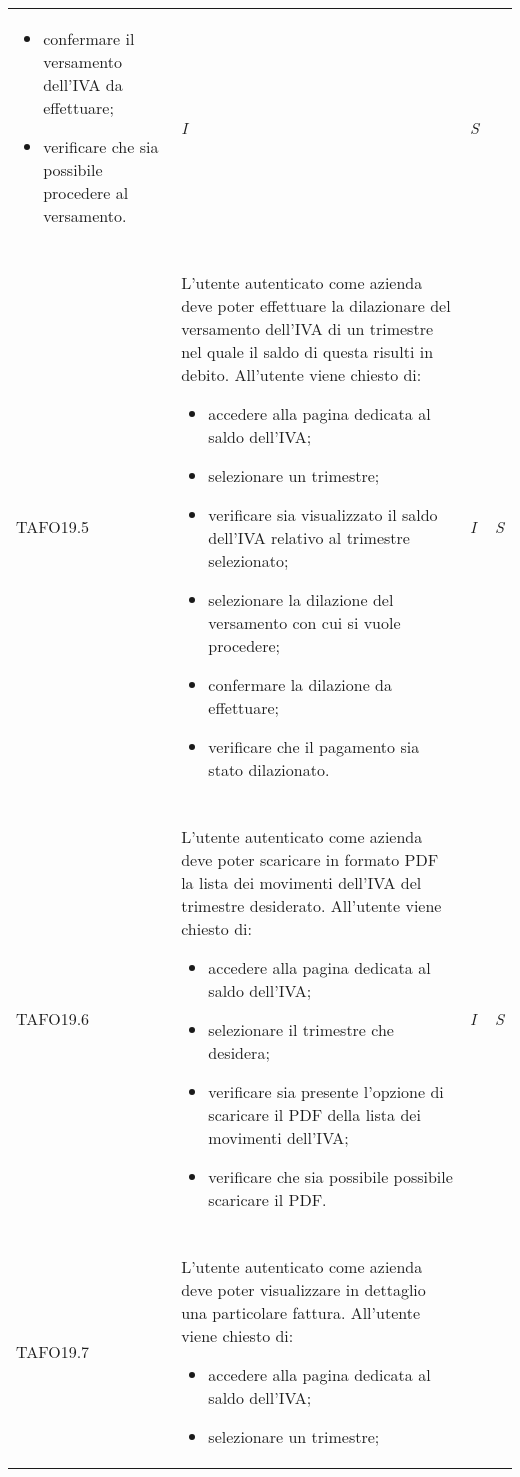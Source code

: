 \begin{longtable}{ >{\centering}p{} >{}p{}
			>{\centering}p{} >{\centering}p{}}
\begin{itemize}
		 	selezionato;
		 	\item confermare il versamento dell'IVA da effettuare;
		 	\item verificare che sia possibile procedere al versamento.
		 \end{itemize} & \textit{I} & \textit{S}\\ \tabularnewline
\hypertarget{TAFO19.5}{TAFO19.5} & L'utente autenticato come azienda deve poter effettuare la dilazionare del versamento 
		 dell'IVA di un trimestre nel quale il saldo di questa risulti in debito. All'utente 
		 viene chiesto di:
		 \begin{itemize}
		 	\item accedere alla pagina dedicata al saldo dell'IVA;
		 	\item selezionare un trimestre;
		 	\item verificare sia visualizzato il saldo dell'IVA relativo al trimestre
		 	selezionato;
		 	\item selezionare la dilazione del versamento con cui si vuole procedere;
		 	\item confermare la dilazione da effettuare;
		 	\item verificare che il pagamento sia stato dilazionato.
		 \end{itemize} & \textit{I} & \textit{S}\\ \tabularnewline
\hypertarget{TAFO19.6}{TAFO19.6} & L'utente autenticato come azienda deve poter scaricare in formato PDF 
		 la lista dei movimenti dell'IVA del trimestre desiderato. All'utente viene chiesto 
		 di:
		 \begin{itemize}
		 	\item accedere alla pagina dedicata al saldo dell'IVA;
		 	\item selezionare il trimestre che desidera;
		 	\item verificare sia presente l'opzione di scaricare il PDF della lista
		 	dei movimenti dell'IVA;
		 	\item verificare che sia possibile possibile scaricare il PDF.
		 \end{itemize} & \textit{I} & \textit{S}\\ \tabularnewline
\hypertarget{TAFO19.7}{TAFO19.7} & L'utente autenticato come azienda deve poter 
		 visualizzare in
		 dettaglio una particolare fattura. All'utente viene chiesto di:
		 \begin{itemize}
		 	\item accedere alla pagina dedicata al saldo dell'IVA;
		 	\item selezionare un trimestre;

\end{itemize}
\end{longtable}
